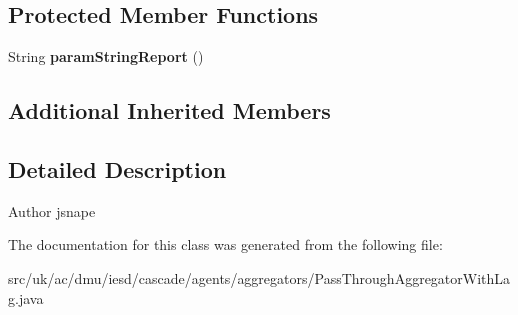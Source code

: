 \subsection*{Protected Member Functions}
\begin{DoxyCompactItemize}
\item 
\hypertarget{classuk_1_1ac_1_1dmu_1_1iesd_1_1cascade_1_1agents_1_1aggregators_1_1_pass_through_aggregator_with_lag_acf1aa76c81f54a3510cd2fae987be23e}{String {\bfseries param\-String\-Report} ()}\label{classuk_1_1ac_1_1dmu_1_1iesd_1_1cascade_1_1agents_1_1aggregators_1_1_pass_through_aggregator_with_lag_acf1aa76c81f54a3510cd2fae987be23e}

\end{DoxyCompactItemize}
\subsection*{Additional Inherited Members}


\subsection{Detailed Description}
\begin{DoxyAuthor}{Author}
jsnape 
\end{DoxyAuthor}


The documentation for this class was generated from the following file\-:\begin{DoxyCompactItemize}
\item 
src/uk/ac/dmu/iesd/cascade/agents/aggregators/Pass\-Through\-Aggregator\-With\-Lag.\-java\end{DoxyCompactItemize}
